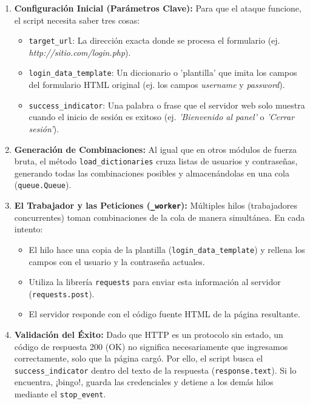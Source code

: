 \documentclass[12pt,a4paper]{article}
\begin{document}
\begin{enumerate}
    \item \textbf{Configuración Inicial (Parámetros Clave):} 
    Para que el ataque funcione, el script necesita saber tres cosas:
    \begin{itemize}
        \item \texttt{target\_url}: La dirección exacta donde se procesa el formulario (ej. \textit{http://sitio.com/login.php}).
        \item \texttt{login\_data\_template}: Un diccionario o 'plantilla' que imita los campos del formulario HTML original (ej. los campos \textit{username} y \textit{password}).
        \item \texttt{success\_indicator}: Una palabra o frase que el servidor web solo muestra cuando el inicio de sesión es exitoso (ej. \textit{'Bienvenido al panel'} o \textit{'Cerrar sesión'}).
    \end{itemize}

    \item \textbf{Generación de Combinaciones:}
    Al igual que en otros módulos de fuerza bruta, el método \texttt{load\_dictionaries} cruza listas de usuarios y contraseñas, generando todas las combinaciones posibles y almacenándolas en una cola (\texttt{queue.Queue}).

    \item \textbf{El Trabajador y las Peticiones (\texttt{\_worker}):}
    Múltiples hilos (trabajadores concurrentes) toman combinaciones de la cola de manera simultánea. En cada intento:
    \begin{itemize}
        \item El hilo hace una copia de la plantilla (\texttt{login\_data\_template}) y rellena los campos con el usuario y la contraseña actuales.
        \item Utiliza la librería \texttt{requests} para enviar esta información al servidor (\texttt{requests.post}).
        \item El servidor responde con el código fuente HTML de la página resultante.
    \end{itemize}

    \item \textbf{Validación del Éxito:}
    Dado que HTTP es un protocolo sin estado, un código de respuesta 200 (OK) no significa necesariamente que ingresamos correctamente, solo que la página cargó. Por ello, el script busca el \texttt{success\_indicator} dentro del texto de la respuesta (\texttt{response.text}). Si lo encuentra, ¡bingo!, guarda las credenciales y detiene a los demás hilos mediante el \texttt{stop\_event}.
\end{enumerate}
\end{document}
